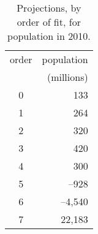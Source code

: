   \begin{table}[htbp]  %
    \caption{Projections, by order of fit, for population in 2010.}
    \begin{center}
      \begin{tabular}{cr}
        order & population \\
        & (millions) \\\hline
         0 & 133 \\
         1 & 264 \\
         2 & 320 \\
         3 & 420 \\
         4 & 300 \\
         5 & --928 \\
         6 & --4,540 \\
         7 & 22,183 \\
      \end{tabular}
    \end{center}
  \end{table}%
\endinput